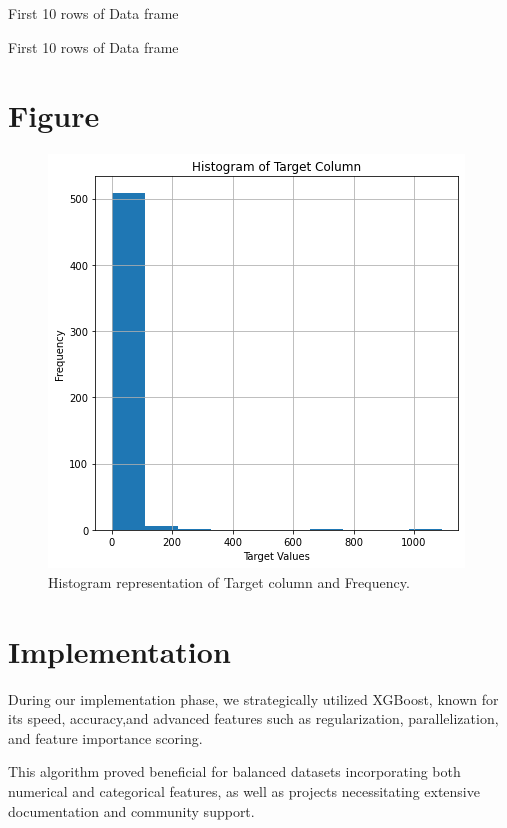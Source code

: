 
\clearpage
First 10 rows of Data frame
\begin{table}[ht!]
    \centering
    
    \label{tab:DataFrame}
    \caption{First 10 rows of Data frame}
\end{table}

\clearpage
\section{Figure}
\begin{figure}[ht]
    \centering
    \includegraphics[scale=1.0]{figures/output_14_0.png}
    \caption{Histogram representation of Target column and Frequency.}
\end{figure}


\clearpage
\section {Implementation}
During our implementation phase, we strategically utilized XGBoost, known for its speed, accuracy,and advanced features such as regularization, parallelization, and feature importance scoring. 

This algorithm proved beneficial for balanced datasets incorporating both numerical and categorical features, as well as projects necessitating extensive documentation and community support.

